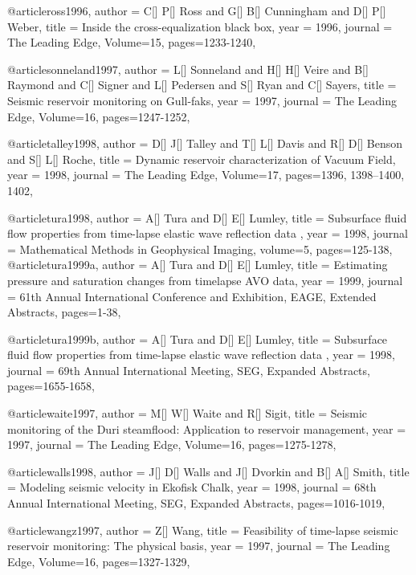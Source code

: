 @article{ross1996,
  author =	 {C[] P[] Ross and G[] B[] Cunningham and D[] P[] Weber},
  title =	 {Inside the cross-equalization black box},
  year =	 1996,
  journal =	 {The Leading Edge},
    Volume=15,
 pages=1233-1240,
}

@article{sonneland1997,
  author =	 {L[] Sonneland and H[] H[] Veire and B[] Raymond and C[] Signer and L[] Pedersen and S[] Ryan and C[] Sayers},
  title =	 {Seismic reservoir monitoring on Gull-faks},
  year =	 1997,
  journal =	 {The Leading Edge},
    Volume=16,
 pages=1247-1252,
}

@article{talley1998,
  author =	 {D[] J[] Talley and T[] L[] Davis and R[] D[] Benson and S[] L[] Roche},
  title =	 {Dynamic reservoir characterization of Vacuum Field},
  year =	 1998,
  journal =	 {The Leading Edge},
    Volume=17,
 pages=1396, 1398–1400, 1402,
}

@article{tura1998,
  author =	 {A[] Tura and D[] E[] Lumley},
  title =	 { Subsurface fluid flow properties from time-lapse elastic wave reflection data },
  year =	 1998,
  journal =	 {Mathematical Methods in Geophysical Imaging},
  volume=5,
 pages=125-138,
}
@article{tura1999a,
  author =	 {A[] Tura and D[] E[] Lumley},
  title =	 {Estimating pressure and saturation changes from timelapse AVO data},
  year =	 1999,
  journal =	 {61th Annual International Conference and Exhibition, EAGE, Extended Abstracts},
 pages=1-38,
}

@article{tura1999b,
  author =	 {A[] Tura and D[] E[] Lumley},
  title =	 { Subsurface fluid flow properties from time-lapse elastic wave reflection data },
  year =	 1998,
 journal =	 {69th Annual International Meeting, SEG, Expanded Abstracts},
 pages=1655-1658,
}

@article{waite1997,
  author =	 {M[] W[] Waite and R[] Sigit},
  title =	 {Seismic monitoring of the Duri steamflood: Application to reservoir management},
  year =	 1997,
  journal =	 {The Leading Edge},
    Volume=16,
 pages=1275-1278,
}

@article{walls1998,
  author =	 {J[] D[] Walls and J[] Dvorkin and B[] A[] Smith},
  title =	 {Modeling seismic velocity in Ekofisk Chalk},
  year =	 1998,
 journal =	 {68th Annual International Meeting, SEG, Expanded Abstracts},
 pages=1016-1019,
}

@article{wangz1997,
  author =	 {Z[] Wang},
  title =	 {Feasibility of time-lapse seismic reservoir monitoring:
The physical basis},
  year =	 1997,
  journal =	 {The Leading Edge},
    Volume=16,
 pages=1327-1329,
}

